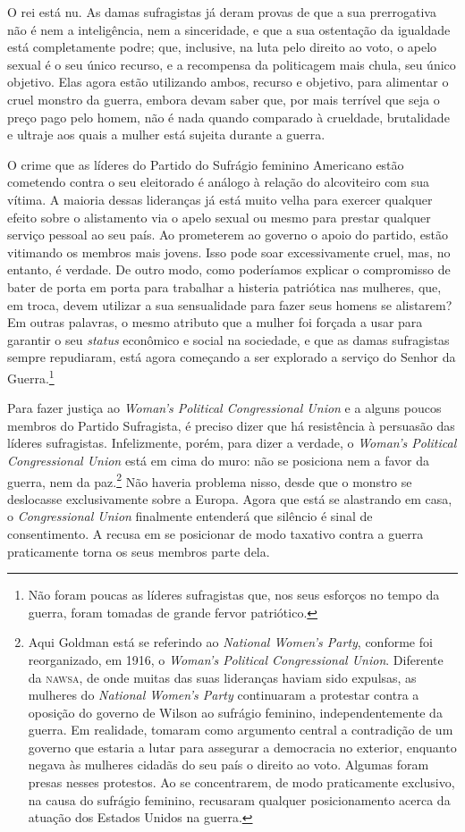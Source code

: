 O rei está nu. As damas sufragistas já deram provas de que a sua
prerrogativa não é nem a inteligência, nem a sinceridade, e que a sua
ostentação da igualdade está completamente podre; que, inclusive, na
luta pelo direito ao voto, o apelo sexual é o seu único recurso, e a
recompensa da politicagem mais chula, seu único objetivo. Elas agora
estão utilizando ambos, recurso e objetivo, para alimentar o cruel
monstro da guerra, embora devam saber que, por mais terrível que seja o
preço pago pelo homem, não é nada quando comparado à crueldade,
brutalidade e ultraje aos quais a mulher está sujeita durante a guerra.

O crime que as líderes do Partido do Sufrágio feminino Americano estão
cometendo contra o seu eleitorado é análogo à relação do alcoviteiro com
sua vítima. A maioria dessas lideranças já está muito velha para exercer
qualquer efeito sobre o alistamento via o apelo sexual ou mesmo para
prestar qualquer serviço pessoal ao seu país. Ao prometerem ao governo o
apoio do partido, estão vitimando os membros mais jovens. Isso pode soar
excessivamente cruel, mas, no entanto, é verdade. De outro modo, como
poderíamos explicar o compromisso de bater de porta em porta para
trabalhar a histeria patriótica nas mulheres, que, em troca, devem
utilizar a sua sensualidade para fazer seus homens se alistarem? Em
outras palavras, o mesmo atributo que a mulher foi forçada a usar para
garantir o seu \emph{status} econômico e social na sociedade, e que as
damas sufragistas sempre repudiaram, está agora começando a ser
explorado a serviço do Senhor da Guerra.\footnote{Não foram poucas as
  líderes sufragistas que, nos seus esforços no tempo da guerra, foram
  tomadas de grande fervor patriótico.}

Para fazer justiça ao \emph{Woman's Political Congressional Union} e a
alguns poucos membros do Partido Sufragista, é preciso dizer que há
resistência à persuasão das líderes sufragistas. Infelizmente, porém,
para dizer a verdade, o \emph{Woman's Political Congressional Union}
está em cima do muro: não se posiciona nem a favor da guerra, nem da
paz.\footnote{Aqui Goldman está se referindo ao \emph{National Women's
  Party}, conforme foi reorganizado, em 1916, o \emph{Woman's Political
  Congressional Union}. Diferente da \textsc{nawsa}, de onde muitas das suas
  lideranças haviam sido expulsas, as mulheres do \emph{National Women's
  Party} continuaram a protestar contra a oposição do governo de Wilson
  ao sufrágio feminino, independentemente da guerra. Em realidade,
  tomaram como argumento central a contradição de um governo que estaria
  a lutar para assegurar a democracia no exterior, enquanto negava às
  mulheres cidadãs do seu país o direito ao voto. Algumas foram presas
  nesses protestos. Ao se concentrarem, de modo praticamente exclusivo,
  na causa do sufrágio feminino, recusaram qualquer posicionamento
  acerca da atuação dos Estados Unidos na guerra.} Não haveria problema
nisso, desde que o monstro se deslocasse exclusivamente sobre a
Europa. Agora que está se alastrando em casa, o \emph{Congressional
Union} finalmente entenderá que silêncio é sinal de consentimento. A recusa em se
posicionar de modo taxativo contra a guerra praticamente torna os seus
membros parte dela.

